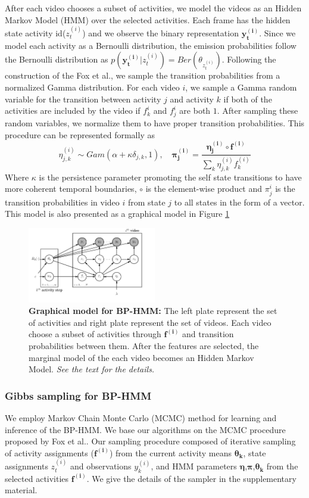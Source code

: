 After each video chooses a subset of activities, we model the videos as an Hidden Markov Model (HMM) over the selected activities. Each frame has the hidden state activity id($z^{(i)}_t$) and we observe the binary representation $\mathbf{y^{(i)}_t}$. Since we model each activity as a Bernoulli distribution, the emission probabilities follow the Bernoulli distribution as $p(\mathbf{y^{(i)}_t}|z^{(i)}_t)=Ber(\theta_{z^{(i)}_t})$. Following the construction of the Fox et al.\cite{foxBPHMM}, we sample the transition probabilities from a normalized Gamma distribution. For each video $i$, we sample a Gamma random variable for the transition between activity $j$ and activity $k$ if both of the activities are included by the video \ie if $f^i_k$ and $f^i_j$ are both $1$. After sampling these random variables, we normalize them to have proper transition probabilities. This procedure can be represented formally as
\begin{equation}
  \eta_{j,k}^{(i)} \sim Gam(\alpha+\kappa \delta_{j,k},1), \quad \mathbf{\pi_j^{(i)}} = \frac{\mathbf{\eta^{(i)}_j} \circ \mathbf{f^{(i)}}}{\sum_k \eta^{(i)}_{j,k} f^{(i)}_k}
\end{equation}
Where $\kappa$ is the persistence parameter promoting the self state transitions to have more coherent temporal boundaries, $\circ$ is the element-wise product and $\pi^i_j$ is the transition probabilities in video $i$ from state $j$ to all states in the form of a vector. This model is also presented as a graphical model in Figure \ref{bphmmo}
\begin{figure}[h!]
  \includegraphics[width=0.5\textwidth]{plate}
  \caption{\textbf{Graphical model for BP-HMM:} The left plate represent the set of activities and right plate represent the set of videos. Each video choose a subset of activities through $\mathbf{f^{(i)}}$ and transition probabilities between them. After the features are selected, the marginal model of the each video becomes an Hidden Markov Model. \emph{See the text for the details.}}
  \label{bphmmo}
\end{figure}


\subsubsection{Gibbs sampling for BP-HMM}
We employ Markov Chain Monte Carlo (MCMC) method for learning and inference of the BP-HMM. We base our algorithms on the MCMC procedure proposed by Fox et al.\cite{foxBPHMM}. Our sampling procedure composed of iterative sampling of activity assignments ($\mathbf{f^{(i)}}$) from the current activity means $\mathbf{\theta_k}$, state assignments $z^{(i)}_t$ and observations $y^{(i)}_k$, and HMM parameters $\mathbf{\eta}$,$\mathbf{\pi}$,$\mathbf{\theta_k}$ from the selected activities $\mathbf{f^{(i)}}$. We give the details of the sampler in the supplementary material.
